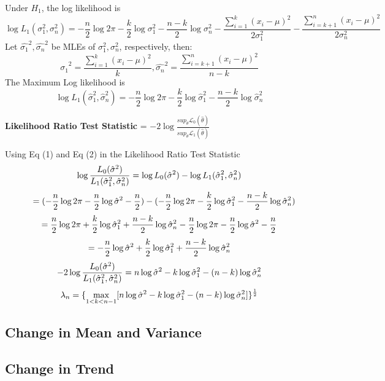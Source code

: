 \documentclass{article}
\newcommand\tab[1][0.4cm]{\hspace*{#1}}
\begin{document}
Under $H_{1}$, the log likelihood is 
$$    \log L_{1} (\sigma^{2}_{1},\sigma^{2}_{n}) =  -\frac{n}{2}\log 2\pi -\frac{k}{2} \log \sigma_{1}^{2} -\frac{n-k}{2} \log \sigma_{n}^{2} - \frac{\sum^{k}_{i=1} (x_{i} - \mu)^{2}}{2\sigma_{1}^{2}} - \frac{\sum^{n}_{i=k+1} (x_{i} - \mu)^{2}}{2\sigma_{n}^{2}}$$
Let $\hat{\sigma_{1}}^{2},\hat{\sigma_{n}}^{2}$ be MLEs of $\sigma_{1}^{2},\sigma_{n}^{2}$, respectively, then:
$$\hat{\sigma_{1}}^{2} = \frac{\sum^{k}_{i=1} (x_{i} - \mu)^{2}}{k}, \hat{\sigma_{n}}^{2} = \frac{\sum^{n}_{i=k+1} (x_{i} - \mu)^{2}}{n-k}$$
The Maximum Log likelihood is 
\begin{equation}
    \log L_{1}(\hat{\sigma}_{1}^{2},\hat{\sigma}_{n}^{2}) = -\frac{n}{2}\log 2\pi -\frac{k}{2} \log \hat{\sigma}_{1}^{2} -\frac{n-k}{2} \log \hat{\sigma}_{n}^{2}
\end{equation}

\textbf{Likelihood Ratio Test Statistic} = $-2\log \frac{sup_{\theta}\mathcal{L}_{0}(\hat{\theta})}{sup_{\theta}\mathcal{L}_{1}(\hat{\theta})}$


Using Eq (1) and Eq (2) in the Likelihood Ratio Test Statistic
$$ \log \frac{L_{0}(\Hat{\sigma}^{2})}{L_{1}(\hat{\sigma}_{1}^{2},\hat{\sigma}_{n}^{2})} = \log L_{0}(\Hat{\sigma}^{2}) - \log L_{1}(\hat{\sigma}_{1}^{2},\hat{\sigma}_{n}^{2})$$
$$\tab = (-\frac{n}{2}\log 2\pi -\frac{n}{2} \log \Hat{\sigma}^{2} -\frac{n}{2}) - (-\frac{n}{2}\log 2\pi -\frac{k}{2} \log \hat{\sigma}_{1}^{2} -\frac{n-k}{2} \log \hat{\sigma}_{n}^{2})$$
$$= \frac{n}{2}\log 2\pi +\frac{k}{2} \log \hat{\sigma}_{1}^{2} +\frac{n-k}{2} \log \hat{\sigma}_{n}^{2} -\frac{n}{2}\log 2\pi -\frac{n}{2} \log \Hat{\sigma}^{2} -\frac{n}{2} $$
$$= -\frac{n}{2} \log \Hat{\sigma}^{2} +\frac{k}{2} \log \hat{\sigma}_{1}^{2} +\frac{n-k}{2} \log \hat{\sigma}_{n}^{2}  $$
$$ -2\log \frac{L_{0}(\Hat{\sigma}^{2})}{L_{1}(\hat{\sigma}_{1}^{2},\hat{\sigma}_{n}^{2})} = n \log \Hat{\sigma}^{2} -k \log \hat{\sigma}_{1}^{2} - (n-k) \log \hat{\sigma}_{n}^{2}$$
$$\lambda_{n} = \{ \max_{1<k<n-1} [n \log \Hat{\sigma}^{2} -k \log \hat{\sigma}_{1}^{2} - (n-k) \log \hat{\sigma}_{n}^{2}] \}^{\frac{1}{2}}$$

\subsection{Change in Mean and Variance}
\subsection{Change in Trend}
\end{document}

